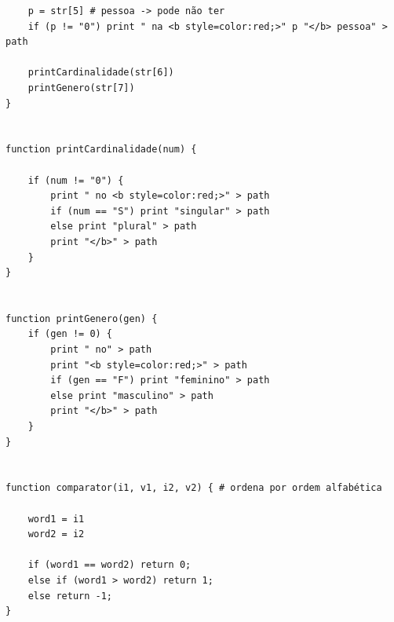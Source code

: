 \documentclass[11pt,a4paper]{report}%
\begin{document}
\begin{verbatim}
	p = str[5] # pessoa -> pode não ter 
	if (p != "0") print " na <b style=color:red;>" p "</b> pessoa" > path
	
	printCardinalidade(str[6])
	printGenero(str[7])
}


function printCardinalidade(num) {

	if (num != "0") {
		print " no <b style=color:red;>" > path
		if (num == "S") print "singular" > path
		else print "plural" > path
		print "</b>" > path
	}
}


function printGenero(gen) {
	if (gen != 0) {
		print " no" > path
		print "<b style=color:red;>" > path
		if (gen == "F") print "feminino" > path
		else print "masculino" > path
		print "</b>" > path
	}
}


function comparator(i1, v1, i2, v2) { # ordena por ordem alfabética

	word1 = i1
	word2 = i2

	if (word1 == word2) return 0;
    else if (word1 > word2) return 1;
    else return -1;
}
\end{verbatim}
\end{document}
